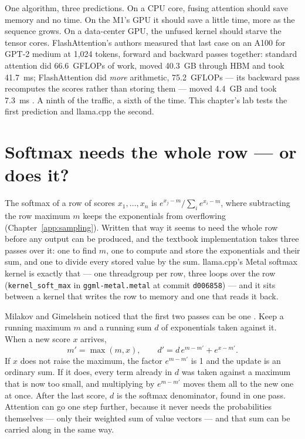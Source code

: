 \noindent One algorithm, three predictions. On a CPU core, fusing attention
should save memory and no time. On the M1's GPU it should save a little time,
more as the sequence grows. On a data-center GPU, the unfused kernel should
starve the tensor cores. FlashAttention's authors measured that last case on an
A100 for GPT-2 medium at 1,024 tokens, forward and backward passes together:
standard attention did 66.6~GFLOPs of work, moved 40.3~GB through HBM and took
41.7~ms; FlashAttention did \emph{more} arithmetic, 75.2~GFLOPs --- its
backward pass recomputes the scores rather than storing them --- moved 4.4~GB
and took 7.3~ms \cite[Figure~2]{dao2022flashattention}. A ninth of the traffic,
a sixth of the time. This chapter's lab tests the first prediction and
llama.cpp the second.

\section{Softmax needs the whole row --- or does it?}

The softmax of a row of scores $x_1,\dots,x_n$ is
$e^{x_j-m}/\sum_i e^{x_i-m}$, where subtracting the row maximum $m$ keeps the
exponentials from overflowing (Chapter~\ref{app:sampling}). Written that way
it seems to need the whole row before any output can be produced, and the
textbook implementation takes three passes over it: one to find $m$, one to
compute and store the exponentials and their sum, and one to divide every
stored value by the sum. llama.cpp's Metal softmax kernel is exactly that ---
one threadgroup per row, three loops over the row (\texttt{kernel\_soft\_max}
in \texttt{ggml-metal.metal} at commit \texttt{d006858}) --- and it sits between
a kernel that writes the row to memory and one that reads it back.

Milakov and Gimelshein noticed that the first two passes can be one
\cite{milakov2018online}. Keep a running maximum $m$ and a running sum $d$ of
exponentials taken against it. When a new score $x$ arrives,
\begin{equation}
m' = \max(m, x), \qquad d' = d\,e^{m-m'} + e^{x-m'}.
\label{eq:online-normalizer}
\end{equation}
If $x$ does not raise the maximum, the factor $e^{m-m'}$ is 1 and the update is
an ordinary sum. If it does, every term already in $d$ was taken against a
maximum that is now too small, and multiplying by $e^{m-m'}$ moves them all to
the new one at once. After the last score, $d$ is the softmax denominator, found
in one pass. Attention can go one step further, because it never needs the
probabilities themselves --- only their weighted sum of value vectors --- and
that sum can be carried along in the same way.

